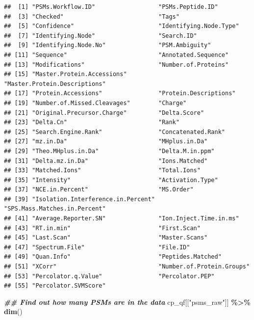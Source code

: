 \documentclass[9pt,a4paper,]{extarticle}
\newenvironment{Shaded}{\begin{snugshade}}{\end{snugshade}}
\newcommand{\DocumentationTok}[1]{\textcolor[rgb]{0.56,0.35,0.01}{\textbf{\textit{#1}}}}
\newcommand{\FunctionTok}[1]{\textcolor[rgb]{0.13,0.29,0.53}{\textbf{#1}}}
\newcommand{\NormalTok}[1]{#1}
\newcommand{\SpecialCharTok}[1]{\textcolor[rgb]{0.81,0.36,0.00}{\textbf{#1}}}
\newcommand{\StringTok}[1]{\textcolor[rgb]{0.31,0.60,0.02}{#1}}
\begin{document}
\begin{verbatim}
##  [1] "PSMs.Workflow.ID"                  "PSMs.Peptide.ID"                  
##  [3] "Checked"                           "Tags"                             
##  [5] "Confidence"                        "Identifying.Node.Type"            
##  [7] "Identifying.Node"                  "Search.ID"                        
##  [9] "Identifying.Node.No"               "PSM.Ambiguity"                    
## [11] "Sequence"                          "Annotated.Sequence"               
## [13] "Modifications"                     "Number.of.Proteins"               
## [15] "Master.Protein.Accessions"         "Master.Protein.Descriptions"      
## [17] "Protein.Accessions"                "Protein.Descriptions"             
## [19] "Number.of.Missed.Cleavages"        "Charge"                           
## [21] "Original.Precursor.Charge"         "Delta.Score"                      
## [23] "Delta.Cn"                          "Rank"                             
## [25] "Search.Engine.Rank"                "Concatenated.Rank"                
## [27] "mz.in.Da"                          "MHplus.in.Da"                     
## [29] "Theo.MHplus.in.Da"                 "Delta.M.in.ppm"                   
## [31] "Delta.mz.in.Da"                    "Ions.Matched"                     
## [33] "Matched.Ions"                      "Total.Ions"                       
## [35] "Intensity"                         "Activation.Type"                  
## [37] "NCE.in.Percent"                    "MS.Order"                         
## [39] "Isolation.Interference.in.Percent" "SPS.Mass.Matches.in.Percent"      
## [41] "Average.Reporter.SN"               "Ion.Inject.Time.in.ms"            
## [43] "RT.in.min"                         "First.Scan"                       
## [45] "Last.Scan"                         "Master.Scans"                     
## [47] "Spectrum.File"                     "File.ID"                          
## [49] "Quan.Info"                         "Peptides.Matched"                 
## [51] "XCorr"                             "Number.of.Protein.Groups"         
## [53] "Percolator.q.Value"                "Percolator.PEP"                   
## [55] "Percolator.SVMScore"
\end{verbatim}

\begin{Shaded}
\begin{Highlighting}[]
\DocumentationTok{\#\# Find out how many PSMs are in the data}
\NormalTok{cp\_qf[[}\StringTok{"psms\_raw"}\NormalTok{]] }\SpecialCharTok{\%\textgreater{}\%}
  \FunctionTok{dim}\NormalTok{()}
\end{Highlighting}
\end{Shaded}
\end{document}

